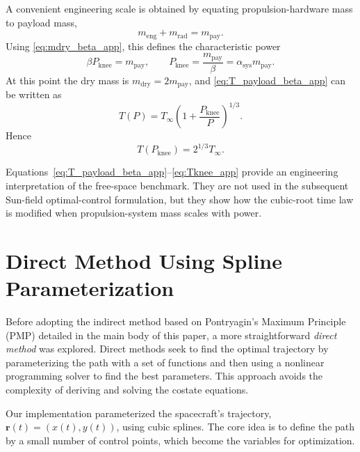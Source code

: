 \documentclass[journal,a4paper]{IEEEtran}
\begin{document}
A convenient engineering scale is obtained by equating propulsion-hardware mass to payload mass,
\begin{equation}
  m_\mathrm{eng}+m_\mathrm{rad}=m_\mathrm{pay}.
\end{equation}
Using \eqref{eq:mdry_beta_app}, this defines the characteristic power
\begin{equation}
  \beta P_\mathrm{knee}=m_\mathrm{pay},
  \qquad
  P_\mathrm{knee}=\frac{m_\mathrm{pay}}{\beta}
  = \alpha_\mathrm{sys}m_\mathrm{pay}.
  \label{eq:Pknee_app}
\end{equation}
At this point the dry mass is \(m_\mathrm{dry}=2m_\mathrm{pay}\), and \eqref{eq:T_payload_beta_app} can be written as
\begin{equation}
  T(P)=T_\infty
  \left(
    1+\frac{P_\mathrm{knee}}{P}
  \right)^{1/3}.
  \label{eq:T_knee_form_app}
\end{equation}
Hence
\begin{equation}
  T(P_\mathrm{knee}) = 2^{1/3}T_\infty.
  \label{eq:Tknee_app}
\end{equation}

Equations~\eqref{eq:T_payload_beta_app}--\eqref{eq:Tknee_app} provide an engineering interpretation of the free-space benchmark.
They are not used in the subsequent Sun-field optimal-control formulation, but they show how the cubic-root time law is modified when propulsion-system mass scales with power.

\section{Direct Method Using Spline Parameterization}

\label{sec:appendix}
Before adopting the indirect method based on Pontryagin's Maximum Principle (PMP) detailed in the main body of this paper, a more straightforward \emph{direct method} was explored. Direct methods seek to find the optimal trajectory by parameterizing the path with a set of functions and then using a nonlinear programming solver to find the best parameters. This approach avoids the complexity of deriving and solving the costate equations.

Our implementation parameterized the spacecraft's trajectory, $\mathbf{r}(t) = (x(t), y(t))$, using cubic splines. The core idea is to define the path by a small number of control points, which become the variables for optimization.
\end{document}
